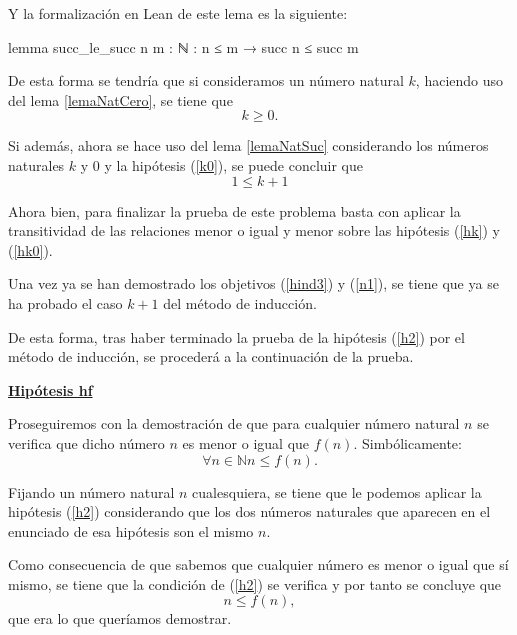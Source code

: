 \begin{demostracion}
\begin{itemize}
\begin{enumerate}
        Y la formalización en Lean de este lema es la siguiente:
        \begin{leancode}
          lemma succ_le_succ {n m : ℕ} : n ≤ m → succ n ≤ succ m
        \end{leancode}

        De esta forma se tendría que si consideramos un número
        natural \(k\), haciendo uso del lema \ref{lemaNatCero}, se
        tiene que
        \begin{equation}\label{k0}
          k≥0.
        \end{equation}

        Si además, ahora se hace uso del lema \ref{lemaNatSuc}
        considerando los números naturales \(k\) y \(0\) y la
        hipótesis (\ref{k0}), se puede concluir que
        \begin{equation}\label{hk0}\tag{hk0}
          1≤k+1
        \end{equation}

        Ahora bien, para finalizar la prueba de este problema basta
        con aplicar la transitividad de las relaciones menor o igual
        y menor sobre las hipótesis (\ref{hk}) y (\ref{hk0}).

      \end{enumerate}

    Una vez ya se han demostrado los objetivos (\ref{hind3}) y
    (\ref{n1}), se tiene que ya se ha probado el caso \(k+1\) del
    método de inducción.
    \end{itemize}

  De esta forma, tras haber terminado la prueba de la hipótesis
  (\ref{h2}) por el método de inducción, se procederá a la
  continuación de la prueba. 

  \noindent
  \textbf{\underline{Hipótesis hf}}
  
  Proseguiremos con la demostración de que para cualquier número
  natural \(n\) se verifica que dicho número \(n\) es menor o igual
  que \(f(n)\). Simbólicamente:
  \begin{equation}\label{hf}\tag{hf}
    ∀n∈ ℕ n≤f(n).
  \end{equation}

  Fijando un número natural \(n\) cualesquiera, se tiene que le
  podemos aplicar la hipótesis (\ref{h2}) considerando que los dos
  números naturales que aparecen en el enunciado de esa hipótesis
  son el mismo \(n\).

  Como consecuencia de que sabemos que cualquier número es menor
  o igual que sí mismo, se tiene que la condición de (\ref{h2}) se
  verifica y por tanto se concluye que
  \begin{equation}
    n≤f(n),
  \end{equation}
  que era lo que queríamos demostrar.


\end{demostracion}
